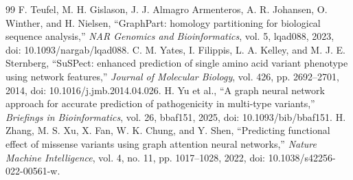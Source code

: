\documentclass[conference]{IEEEtran}
\begin{document}
\begin{thebibliography}{99}
 F. Teufel, M. H. Gislason, J. J. Almagro Armenteros, A. R. Johansen, O. Winther, and H. Nielsen, ``GraphPart: homology partitioning for biological sequence analysis,'' \emph{NAR Genomics and Bioinformatics}, vol. 5, lqad088, 2023, doi: 10.1093/nargab/lqad088.
 C. M. Yates, I. Filippis, L. A. Kelley, and M. J. E. Sternberg, ``SuSPect: enhanced prediction of single amino acid variant phenotype using network features,'' \emph{Journal of Molecular Biology}, vol. 426, pp. 2692--2701, 2014, doi: 10.1016/j.jmb.2014.04.026.
 H. Yu et al., ``A graph neural network approach for accurate prediction of pathogenicity in multi-type variants,'' \emph{Briefings in Bioinformatics}, vol. 26, bbaf151, 2025, doi: 10.1093/bib/bbaf151.
 H. Zhang, M. S. Xu, X. Fan, W. K. Chung, and Y. Shen, ``Predicting functional effect of missense variants using graph attention neural networks,'' \emph{Nature Machine Intelligence}, vol. 4, no. 11, pp. 1017--1028, 2022, doi: 10.1038/s42256-022-00561-w.
\end{thebibliography}
\end{document}
